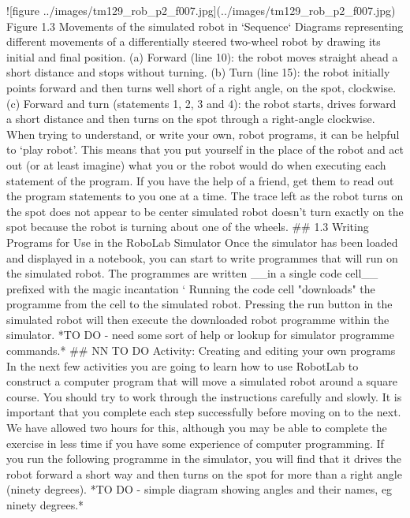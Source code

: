 \documentclass[letterpaper,10pt,english]{sphinxmanual}
\begin{document}
{![figure ../images/tm129_rob_p2_f007.jpg](../images/tm129_rob_p2_f007.jpg)
Figure 1.3 Movements of the simulated robot in `Sequence`
Diagrams representing different movements of a differentially steered two-wheel robot by drawing its initial and final position. (a) Forward (line 10): the robot moves straight ahead a short distance and stops without turning. (b) Turn (line 15): the robot initially points forward and then turns well short of a right angle, on the spot, clockwise. (c) Forward and turn (statements 1, 2, 3 and 4): the robot starts, drives forward a short distance and then turns on the spot through a right-angle clockwise.
When trying to understand, or write your own, robot programs, it can be helpful to ‘play robot’. This means that you put yourself in the place of the robot and act out (or at least imagine) what you or the robot would do when executing each statement of the program. If you have the help of a friend, get them to read out the program statements to you one at a time.
The trace left as the robot turns on the spot does not appear to be center simulated robot doesn't turn exactly on the spot because the robot is turning about one of the wheels.
## 1.3 Writing Programs for Use in the RoboLab Simulator
Once the simulator has been loaded and displayed in a notebook, you can start to write programmes that will run on the simulated robot.
The programmes are written __in a single code cell__ prefixed with the magic incantation `%
Running the code cell "downloads" the programme from the cell to the simulated robot. Pressing the run button in the simulated robot will then execute the downloaded robot programme within the simulator.
*TO DO - need some sort of help or lookup for simulator programme commands.*
## NN TO DO  Activity: Creating and editing your own programs
In the next few activities you are going to learn how to use RobotLab to construct a computer program that will move a simulated robot around a square course. You should try to work through the instructions carefully and slowly. It is important that you complete each step successfully before moving on to the next. We have allowed two hours for this, although you may be able to complete the exercise in less time if you have some experience of computer programming.
If you run the following programme in the simulator, you will find that it drives the robot forward a short way and then turns on the spot for more than a right angle (ninety degrees).
*TO DO - simple diagram showing angles and their names, eg ninety degrees.*
}
\end{document}

